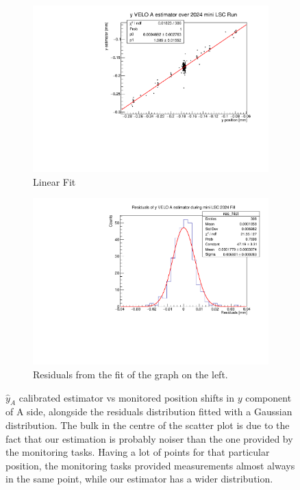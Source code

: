 \begin{figure}
    \centering
    \begin{subfigure}{0.48\textwidth}
    \includegraphics[width=\linewidth]{figures/yVeloA_fit_comparison.pdf}
    \caption{Linear Fit}\label{fig:yAfit_comparison}
    \end{subfigure}
    \begin{subfigure}{0.48\textwidth}
    \includegraphics[width=\linewidth]{figures/yVeloA_res_comparison.pdf}
    \caption{Residuals from the fit of the graph on the left. }\label{fig:yAres_comparison}
    \end{subfigure}
    \caption{$\hat{y}_{A}$ calibrated estimator vs monitored position shifts in $y$ component of A side, alongside the residuals distribution fitted with a Gaussian distribution. The bulk in the centre of the scatter plot is due to the fact that our estimation is probably noiser than the one provided by the monitoring tasks. Having a lot of points for that particular position, the monitoring tasks provided measurements almost always in the same point, while our estimator has a wider distribution.}
    \label{fig:yA_comparison}
\end{figure}

